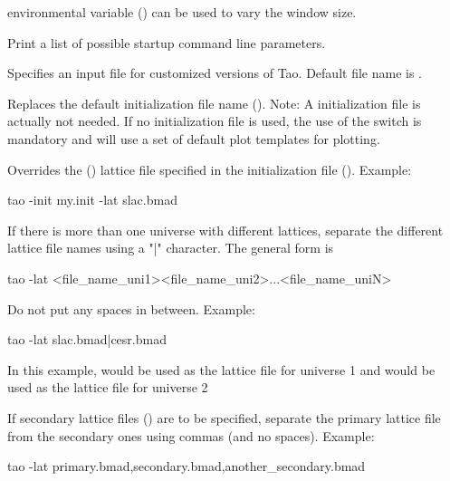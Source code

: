 \begin{description}
{{environmental variable  () can be used to vary the
window size.
%
\item[-help] \Newline
Print a list of possible startup command line parameters.
%
\item[-hook_init_file] \Newline
Specifies an input file for customized versions of Tao. Default file
name is .
%
\item[-init_file <file_name>] \Newline
Replaces the default \tao initialization file name (). Note: A \tao initialization file
is actually not needed. If no \tao initialization file is used, the use of the 
switch is mandatory and \tao will use a set of default plot templates for plotting.
%
\item[-lattice_file <file_name>] \Newline
Overrides the  () lattice file specified in the \tao initialization file
(). Example:
\begin{example}
  tao -init my.init -lat slac.bmad
\end{example}
If there is more than one universe with different lattices, separate the different
lattice file names using a "|" character. The general form is
\begin{example}
  tao -lat <file_name_uni1><file_name_uni2>...<file_name_uniN>
\end{example}
 Do not put any spaces in between. Example:
\begin{example}
  tao -lat slac.bmad|cesr.bmad
\end{example}
In this example,  would be used as the lattice file for universe 1 and 
would be used as the lattice file for universe 2

If secondary lattice files () are to be specified, separate the primary lattice file from
the secondary ones using commas (and no spaces). Example:
\begin{example}
  tao -lat primary.bmad,secondary.bmad,another_secondary.bmad
\end{example}

}}
\end{description}
